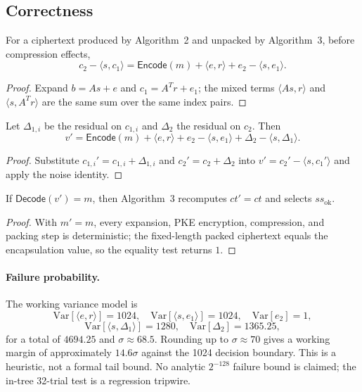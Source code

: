 \documentclass[runningheads]{llncs}
\newcommand{\Encode}{\mathsf{Encode}}
\newcommand{\Decode}{\mathsf{Decode}}
\begin{document}
\subsection{Correctness}

\begin{lemma}
For a ciphertext produced by Algorithm~2 and unpacked by Algorithm~3,
before compression effects,
\[
 c_2-\langle s,c_1\rangle
 =\Encode(m)+\langle e,r\rangle+e_2-\langle s,e_1\rangle.
\]
\end{lemma}

\begin{proof}
Expand $b=A s+e$ and $c_1=A^T r+e_1$; the mixed terms
$\langle A s,r\rangle$ and $\langle s,A^T r\rangle$ are the same sum
over the same index pairs.
\end{proof}

\begin{lemma}
Let $\Delta_{1,i}$ be the residual on $c_{1,i}$ and $\Delta_2$ the
residual on $c_2$.  Then
\[
 v'=\Encode(m)+\langle e,r\rangle+e_2-\langle s,e_1\rangle
 +\Delta_2-\langle s,\Delta_1\rangle.
\]
\end{lemma}

\begin{proof}
Substitute $c_{1,i}'=c_{1,i}+\Delta_{1,i}$ and
$c_2'=c_2+\Delta_2$ into $v'=c_2'-\langle s,c_1'\rangle$ and apply
the noise identity.
\end{proof}

\begin{lemma}
If $\Decode(v')=m$, then Algorithm~3 recomputes $ct'=ct$ and selects
$ss_{\mathrm{ok}}$.
\end{lemma}

\begin{proof}
With $m'=m$, every expansion, PKE encryption, compression, and packing
step is deterministic; the fixed-length packed ciphertext equals the
encapsulation value, so the equality test returns $1$.
\end{proof}

\paragraph{Failure probability.}
The working variance model is
\[
 \mathrm{Var}[\langle e,r\rangle]=1024,\quad
 \mathrm{Var}[\langle s,e_1\rangle]=1024,\quad
 \mathrm{Var}[e_2]=1,
\]
\[
 \mathrm{Var}[\langle s,\Delta_1\rangle]=1280,\quad
 \mathrm{Var}[\Delta_2]=1365.25,
\]
for a total of $4694.25$ and $\sigma\approx68.5$.  Rounding up to
$\sigma\approx70$ gives a working margin of approximately
$14.6\sigma$ against the 1024 decision boundary.  This is a heuristic,
not a formal tail bound.  No analytic $2^{-128}$ failure bound is
claimed; the in-tree 32-trial test is a regression tripwire.
\end{document}
